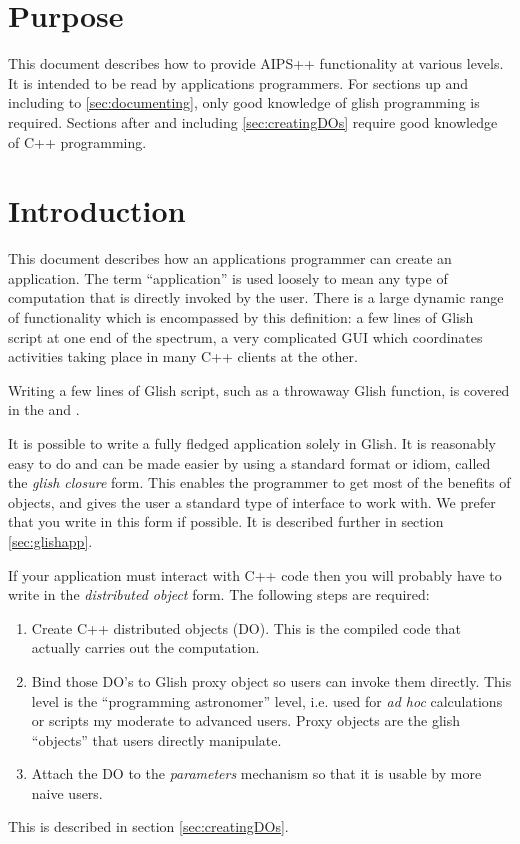 \section{Purpose}
\label{sec:purpose}

This document describes how to provide AIPS++ functionality at various
levels. It is intended to be read by applications programmers.  For
sections up and including to \ref{sec:documenting}, only good
knowledge of glish programming is required. Sections after and
including \ref{sec:creatingDOs} require good knowledge of
C++ programming.

\section{Introduction}
\label{sec:introduction}

This document describes how an applications programmer can create an
application. The term ``application'' is used loosely to mean any type
of computation that is directly invoked by the user. There is a large
dynamic range of functionality which is encompassed by this
definition: a few lines of Glish script at one end of the spectrum,
a very complicated GUI which coordinates activities taking place in
many C++ clients at the other.

Writing a few lines of Glish script, such as a throwaway Glish
function, is covered in the  and .

It is possible to write a fully fledged application solely in
Glish. It is reasonably easy to do and can be made easier by using a
standard format or idiom, called the {\em glish closure} form. This
enables the programmer to get most of the benefits of objects, and
gives the user a standard type of interface to work with. We
prefer that you write in this form if possible. It is
described further in section \ref{sec:glishapp}.

If your application must interact with C++ code then you will
probably have to write in the {\em distributed object} form.
The following steps are required:
\begin{enumerate}
    \item Create C++ distributed objects (DO). This is the compiled
          code that actually carries out the computation.
    \item Bind those DO's to Glish proxy object so users can invoke
          them directly. This level is the ``programming astronomer''
          level, i.e. used for {\em ad hoc} calculations or scripts
          my moderate to advanced users.
          Proxy objects are the glish ``objects'' that users directly
          manipulate.
    \item Attach the DO to the {\em parameters} mechanism so that it
          is usable by more naive users.
\end{enumerate}
This is described in section \ref{sec:creatingDOs}.

